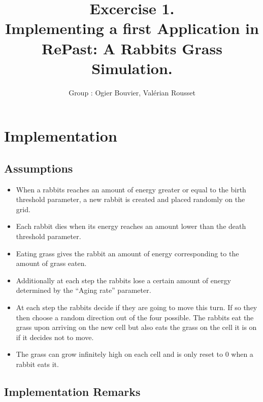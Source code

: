 \documentclass[11pt]{article}
\title{\bf Excercise 1.\\ Implementing a first Application in RePast: A Rabbits Grass Simulation.}
\author{Group \textnumero 17: Ogier Bouvier, Val\'erian Rousset}
\begin{document}
\maketitle

\section{Implementation}

\subsection{Assumptions}

\begin{itemize}
        \item When a rabbits reaches an amount of energy greater or
          equal to the birth threshold parameter, a new rabbit is
          created and placed randomly on the grid.
        \item Each rabbit dies when its energy reaches an amount lower
          than the death threshold parameter.
        \item Eating grass gives the rabbit an amount of energy
          corresponding to the amount of grass eaten.
        \item Additionally at each step the rabbits lose a certain
          amount of energy determined by the ``Aging rate'' parameter.
	\item At each step the rabbits decide if they are going to
          move this turn. If so they then choose a random direction
          out of the four possible. The rabbits eat the grass upon
          arriving on the new cell but also eats the grass on the cell
          it is on if it decides not to move.
        \item The grass can grow infinitely high on each cell and is
          only reset to 0 when a rabbit eats it.
\end{itemize}

\subsection{Implementation Remarks}
\end{document}
